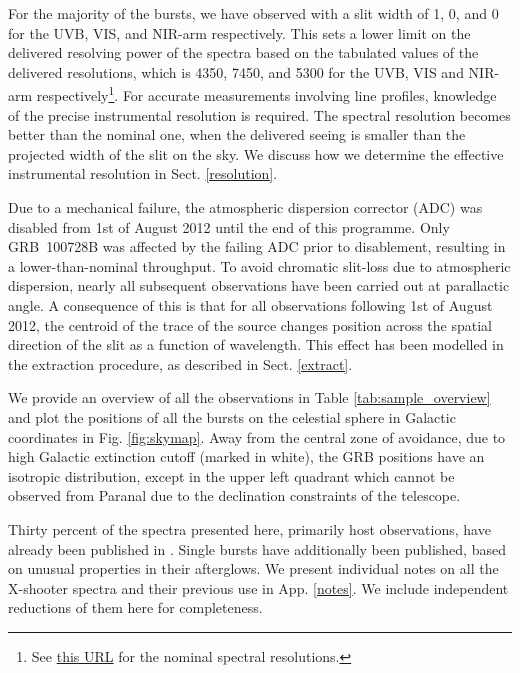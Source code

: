 \documentclass[longauth]{aa}    %
\begin{document}
For the majority of the bursts, we have observed with a slit width of 1,
0, and 0 for the UVB, VIS, and NIR-arm respectively. This sets a
lower limit on the delivered resolving power of the spectra based on the
tabulated values of the delivered resolutions, which is 4350, 7450, and 5300 for
the UVB, VIS and NIR-arm respectively\footnote{See
	\href{https://www.eso.org/sci/facilities/paranal/instruments/xshooter/inst.html}{this URL} for the nominal spectral resolutions.}. 
For accurate measurements involving line profiles, knowledge of the precise
instrumental resolution is required. The spectral resolution becomes better than
the nominal one, when the delivered seeing is smaller than the projected width
of the slit on the sky. We discuss how we determine the effective instrumental
resolution in Sect. \ref{resolution}.

Due to a mechanical failure, the atmospheric dispersion corrector (ADC) was
disabled from 1st of August 2012 until the end of this programme. Only GRB~100728B
was affected by the failing ADC prior to disablement, resulting in a
lower-than-nominal throughput. To avoid chromatic slit-loss due to atmospheric
dispersion, nearly all subsequent observations have been carried out at
parallactic angle. A consequence of this is that for all observations following
1st of August 2012, the centroid of the trace of the source changes position
across the spatial direction of the slit as a function of wavelength. This
effect has been modelled in the extraction procedure, as described in Sect.
\ref{extract}.



We provide an overview of all the observations in Table
\ref{tab:sample_overview} and plot the positions of all the bursts on the
celestial sphere in Galactic coordinates in Fig. \ref{fig:skymap}. Away from the
central zone of avoidance, due to high Galactic extinction cutoff (marked in
white), the GRB positions have an isotropic distribution, except in the upper
left quadrant which cannot be observed from Paranal due to the declination
constraints of the telescope.

Thirty percent of the spectra presented here, primarily host observations, have
already been published in \citet{Kruhler2015}. Single bursts have additionally
been published, based on unusual properties in their afterglows. We present
individual notes on all the X-shooter spectra and their previous use in App.
\ref{notes}. We include independent reductions of them here for completeness.
\end{document}

